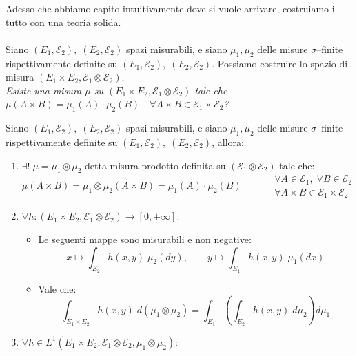 \bigskip
\noindent Adesso che abbiamo capito intuitivamente dove si vuole arrivare, costruiamo il tutto con una teoria solida.\\
\\
Siano $(E_1, \mathcal{E}_2), \; (E_2, \mathcal{E}_2)$ spazi misurabili, e siano $\mu_1, \mu_2$ delle misure $\sigma$--finite rispettivamente definite su $(E_1, \mathcal{E}_2), \; (E_2, \mathcal{E}_2)$. Possiamo costruire lo spazio di misura $(E_1\times E_2, \mathcal{E}_1 \otimes \mathcal{E}_2)$.\\

\noindent \textit{Esiste una misura $\mu$ su $(E_1\times E_2, \mathcal{E}_1 \otimes \mathcal{E}_2)$ tale che $\mu (A\times B) = \mu_1(A)\cdot \mu_2(B)\quad \forall A\times B \in \mathcal{E}_1\times \mathcal{E}_2$?}

\begin{teorema}
        Siano $(E_1, \mathcal{E}_2), \; (E_2, \mathcal{E}_2)$ spazi misurabili, e siano $\mu_1, \mu_2$ delle misure $\sigma$--finite rispettivamente definite su $(E_1, \mathcal{E}_2), \; (E_2, \mathcal{E}_2)$, allora:
        \begin{enumerate}
            \item $\exists!\; \mu = \mu_1\otimes\mu_2$ detta misura prodotto definita su $(\mathcal{E}_1 \otimes \mathcal{E}_2)$ tale che:
            \[\mu(A\times B) = \mu_1\otimes\mu_2(A\times B) = \mu_1(A)\cdot \mu_2(B)\qquad \quad \begin{aligned}
                \forall A\in \mathcal{E}_1,\;\forall B\in \mathcal{E}_2\\
                \forall A\times B \in \mathcal{E}_1\times \mathcal{E}_2
            \end{aligned}\]
            \item $\forall h:(E_1\times E_2, \mathcal{E}_1 \otimes \mathcal{E}_2)\to [0, +\infty]$:
            \begin{itemize}
                \item Le seguenti mappe sono misurabili e non negative:
                \[x\longmapsto\int_{E_2} h(x, y)\;\mu_2(dy), \qquad y\longmapsto\int_{E_1}h(x, y)\;\mu_1(dx)\]
                \item Vale che:
                \[\int_{E_1\times E_2}h(x, y)\;d(\mu_1\otimes \mu_2) = \int_{E_1}\left(\int_{E_2}h(x, y)\;d\mu_2\right)d\mu_1\]
            \end{itemize}
            \item $\forall h\in L^1(E_1\times E_2, \mathcal{E}_1 \otimes \mathcal{E}_2, \mu_1\otimes\mu_2)$:

\end{enumerate}
\end{teorema}
